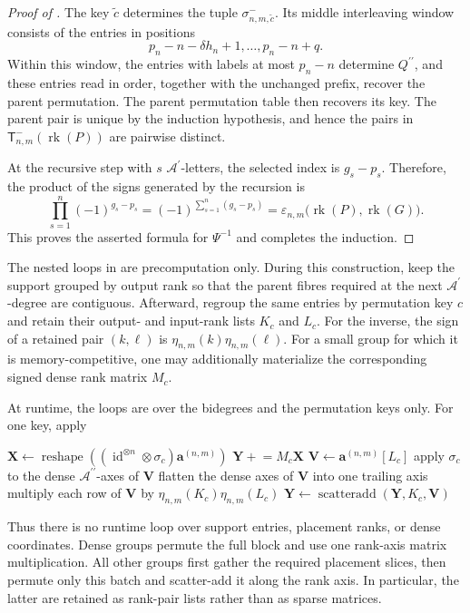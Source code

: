 \documentclass{amsart}
\theoremstyle{definition}
\theoremstyle{remark}
\begin{document}
\begin{proof}[Proof of ]
The key $\widetilde{c}$ determines the tuple
$\sigma^{-}_{n,m,\widetilde{c}}$. Its middle interleaving window consists
of the entries in positions
\[
    p_n-n-\delta h_n+1,
    \ldots,
    p_n-n+q.
\]
Within this window, the entries with labels at most $p_n-n$ determine
$Q^{\prime\prime}$, and these entries read in order, together with the
unchanged prefix, recover the parent permutation. The parent permutation
table then recovers its key. The parent pair is unique by the induction
hypothesis, and hence the pairs in
$\mathsf{T}^{-}_{n,m}(\operatorname{rk}(P))$ are pairwise distinct.

At the recursive step with $s$
$\mathcal{A}^{\prime}$-letters, the selected index is
$g_s-p_s$. Therefore, the product of the signs generated by the recursion
is
\[
    \prod_{s=1}^{n}
    (-1)^{g_s-p_s}
    =
    (-1)^{\sum_{s=1}^{n}(g_s-p_s)}
    =
    \varepsilon_{n,m}
    \bigl(
        \operatorname{rk}(P),
        \operatorname{rk}(G)
    \bigr).
\]
This proves the asserted formula for $\Psi^{-1}$ and completes the
induction.
\end{proof}

\begin{implrmk}
The nested loops in
 are precomputation only.
During this construction, keep the support grouped by output rank so that
the parent fibres required at the next
$\mathcal{A}^{\prime}$-degree are contiguous. Afterward, regroup the same
entries by permutation key $c$ and retain their output- and input-rank lists
$K_c$ and $L_c$. For the inverse, the sign of a retained pair $(k,\ell)$ is
$\eta_{n,m}(k)\eta_{n,m}(\ell)$. For a small group for which it is
memory-competitive, one may additionally materialize the corresponding
signed dense rank matrix $M_c$.

At runtime, the loops are over the bidegrees and the permutation keys only.
For one key, apply
\begin{algorithmic}[1]
    \State $\mathbf{X}\gets
        \operatorname{reshape}
        \left(
            (\operatorname{id}^{\otimes n}\otimes\sigma_c)
            \mathbf{a}^{(n,m)}
        \right)$
    \State $\mathbf{Y}\mathrel{+}=M_c\mathbf{X}$
\Else
    \State $\mathbf{V}\gets\mathbf{a}^{(n,m)}[L_c]$
    \State apply $\sigma_c$ to the dense
        $\mathcal{A}^{\prime\prime}$-axes of $\mathbf{V}$
    \State flatten the dense axes of $\mathbf{V}$ into one trailing axis
        \State multiply each row of $\mathbf{V}$ by
        $\eta_{n,m}(K_c)\eta_{n,m}(L_c)$
    \EndIf
    \State $\mathbf{Y}\gets
        \operatorname{scatteradd}(\mathbf{Y},K_c,\mathbf{V})$
\EndIf
\end{algorithmic}
Thus there is no runtime loop over support entries, placement ranks, or
dense coordinates. Dense groups permute the full block and use one
rank-axis matrix multiplication. All other groups first gather the required
placement slices, then permute only this batch and scatter-add it along the
rank axis. In particular, the latter are retained as rank-pair lists rather
than as sparse matrices.
\end{implrmk}
\end{document}
